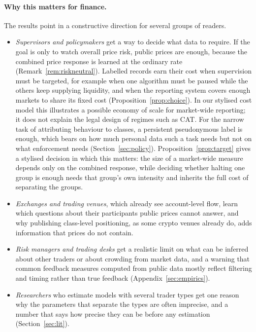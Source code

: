 \documentclass[12pt]{article}
\theoremstyle{definition}
\theoremstyle{remark}
\begin{document}
\paragraph{Why this matters for finance.} The results point in a constructive direction for several groups of readers.
\begin{itemize}[itemsep=1pt]
\item \emph{Supervisors and policymakers} get a way to decide what data to require. If the goal is only to watch overall price risk, public prices are enough, because the combined price response is learned at the ordinary rate (Remark~\ref{rem:riskneutral}). Labelled records earn their cost when supervision must be targeted, for example when one algorithm must be paused while the others keep supplying liquidity, and when the reporting system covers enough markets to share its fixed cost (Proposition~\ref{prop:choice}). In our stylised cost model this illustrates a possible economy of scale for market-wide reporting; it does not explain the legal design of regimes such as CAT. For the narrow task of attributing behaviour to classes, a persistent pseudonymous label is enough, which bears on how much personal data such a task needs but not on what enforcement needs (Section~\ref{sec:policy}). Proposition~\ref{prop:target} gives a stylised decision in which this matters: the size of a market-wide measure depends only on the combined response, while deciding whether halting one group is enough needs that group's own intensity and inherits the full cost of separating the groups.
\item \emph{Exchanges and trading venues}, which already see account-level flow, learn which questions about their participants public prices cannot answer, and why publishing class-level positioning, as some crypto venues already do, adds information that prices do not contain.
\item \emph{Risk managers and trading desks} get a realistic limit on what can be inferred about other traders or about crowding from market data, and a warning that common feedback measures computed from public data mostly reflect filtering and timing rather than true feedback (Appendix~\ref{sec:empirics}).
\item \emph{Researchers} who estimate models with several trader types get one reason why the parameters that separate the types are often imprecise, and a number that says how precise they can be before any estimation (Section~\ref{sec:lit}).
\end{itemize}
\end{document}
